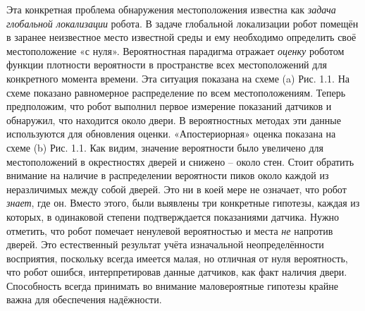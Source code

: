 \documentclass[10pt,a4paper]{article}
\begin{document}
Эта конкретная проблема обнаружения местоположения известна как \textit{задача глобальной локализации} робота. В задаче глобальной локализации робот помещён в заранее неизвестное место известной среды и ему необходимо определить своё местоположение «с нуля». Вероятностная парадигма отражает \textit{оценку} роботом функции плотности вероятности в пространстве всех местоположений для конкретного момента времени. Эта ситуация показана на схеме (a) Рис. 1.1. На схеме показано равномерное распределение по всем местоположениям. Теперь предположим, что робот выполнил первое измерение показаний датчиков и обнаружил, что находится около двери. В вероятностных методах эти данные используются для обновления оценки. «Апостериорная» оценка показана на схеме (b) Рис. 1.1. Как видим, значение вероятности было увеличено для местоположений в окрестностях дверей и снижено – около стен. Стоит обратить внимание на наличие в распределении вероятности пиков около каждой из неразличимых между собой дверей. Это ни в коей мере не означает, что робот \textit{знает}, где он. Вместо этого, были выявлены три конкретные гипотезы, каждая из которых, в одинаковой степени подтверждается показаниями датчика. Нужно отметить, что робот помечает ненулевой вероятностью и места \textit{не} напротив дверей. Это естественный результат учёта изначальной неопределённости восприятия, поскольку всегда имеется малая, но отличная от нуля вероятность, что робот ошибся, интерпретировав данные датчиков, как факт наличия двери. Способность всегда принимать во внимание маловероятные гипотезы крайне важна для обеспечения надёжности.
\end{document}
